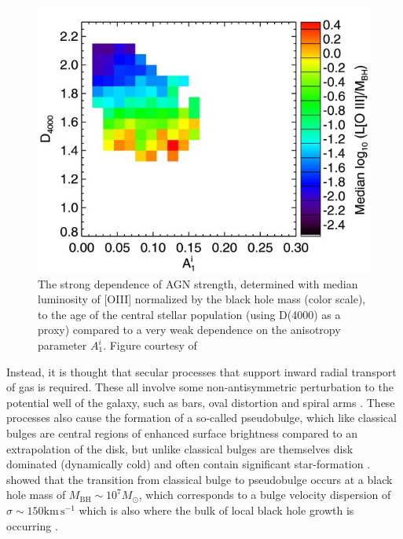 			\begin{figure}
				\centering
				\includegraphics[width=\textwidth]{introduction/age_anisotropy.jpg}
				\caption[The dependence of AGN on age and anisotropies]{The strong dependence of AGN strength, determined with median luminosity of [OIII] normalized by the black hole mass (color scale), to the age of the central stellar population (using D(4000) as a proxy) compared to a very weak dependence on the anisotropy parameter $A_1^i$. Figure courtesy of \citet{Reichard2009}}
				\label{fig:anisotropy}
			\end{figure}

			Instead, it is thought that secular processes that support inward radial transport of gas is required. These all involve some non-antisymmetric perturbation to the potential well of the galaxy, such as bars, oval distortion and spiral arms \citep{Kormendy2004, Athanassoula2008, Sellwood2014}. These processes also cause the formation of a so-called pseudobulge, which like classical bulges are central regions of enhanced surface brightness compared to an extrapolation of the disk, but unlike classical bulges are themselves disk dominated (dynamically cold) and often contain significant star-formation \citep{Gadotti2009}. \citet{Kormendy2013a} showed that the transition from classical bulge to pseudobulge occurs at a black hole mass of $M_\text{BH} \sim 10^7 M_\odot$, which corresponds to a bulge velocity dispersion of $\sigma \sim 150 \mathrm{km \, s^{-1}}$ which is also where the bulk of local black hole growth is occurring \citet{Heckman2004, Kauffmann2009}. 

